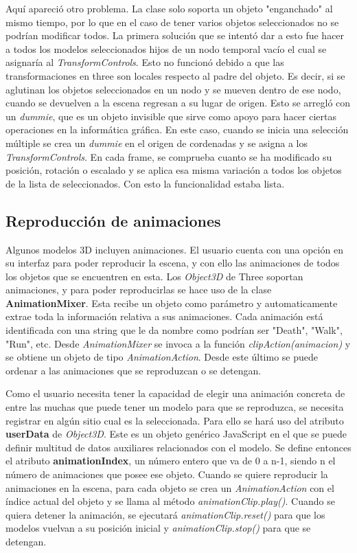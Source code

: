 Aquí apareció otro problema. La clase solo soporta un objeto "enganchado" al mismo tiempo, por lo que en el caso de tener varios objetos seleccionados no se podrían modificar todos. La primera solución que se intentó dar a esto fue hacer a todos los modelos seleccionados hijos de un nodo temporal vacío el cual se asignaría al \textit{TransformControls}. Esto no funcionó debido a que las transformaciones en three son locales respecto al padre del objeto. Es decir, si se aglutinan los objetos seleccionados en un nodo y se mueven dentro de ese nodo, cuando se devuelven a la escena regresan a su lugar de origen. Esto se arregló con un \textit{dummie}, que es un objeto invisible que sirve como apoyo para hacer ciertas operaciones en la informática gráfica. En este caso, cuando se inicia una selección múltiple se crea un \textit{dummie} en el origen de cordenadas y se asigna a los \textit{TransformControls}. En cada frame, se comprueba cuanto se ha modificado su posición, rotación o escalado y se aplica esa misma variación a todos los objetos de la lista de seleccionados. Con esto la funcionalidad estaba lista.

\subsection{Reproducción de animaciones}

Algunos modelos 3D incluyen animaciones. El usuario cuenta con una opción en su interfaz para poder reproducir la escena, y con ello las animaciones de todos los objetos que se encuentren en esta. Los \textit{Object3D} de Three soportan animaciones, y para poder reproducirlas se hace uso de la clase \textbf{AnimationMixer}. Esta recibe un objeto como parámetro y automaticamente extrae toda la información relativa a sus animaciones. Cada animación está identificada con una string que le da nombre como podrían ser "Death", "Walk", "Run", etc. Desde \textit{AnimationMixer} se invoca a la función \textit{clipAction(animacion)} y se obtiene un objeto de tipo \textit{AnimationAction}. Desde este último se puede ordenar a las animaciones que se reproduzcan o se detengan.

Como el usuario necesita tener la capacidad de elegir una animación concreta de entre las muchas que puede tener un modelo para que se reproduzca, se necesita registrar en algún sitio cual es la seleccionada. Para ello se hará uso del atributo \textbf{userData} de \textit{Object3D}. Este es un objeto genérico JavaScript en el que se puede definir multitud de datos auxiliares relacionados con el modelo. Se define entonces el atributo \textbf{animationIndex}, un número entero que va de 0 a n-1, siendo n el número de animaciones que posee ese objeto. Cuando se quiere reproducir la animaciones en la escena, para cada objeto se crea un \textit{AnimationAction} con el índice actual del objeto y se llama al método \textit{animationClip.play()}. Cuando se quiera detener la animación, se ejecutará \textit{animationClip.reset()} para que los modelos vuelvan a su posición inicial y \textit{animationClip.stop()} para que se detengan.

